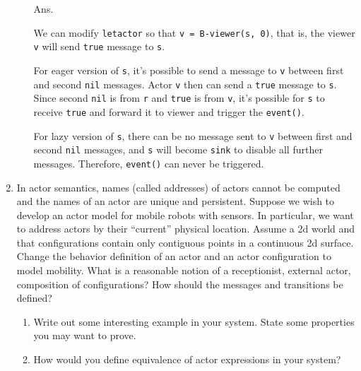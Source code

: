 \documentclass{article}
\begin{document}
\begin{enumerate}
\begin{enumerate}
Ans.

We can modify \texttt{letactor} so that \texttt{v = B-viewer(s, 0)}, that is, 
the viewer \texttt{v} will send \texttt{true} message to \texttt{s}.

For eager version of \texttt{s}, it's possible to send a message to \texttt{v} 
between first and second \texttt{nil} messages. Actor \texttt{v} then can send 
a \texttt{true} message to \texttt{s}. Since second \texttt{nil} is from 
\texttt{r} and \texttt{true} is from \texttt{v}, it's possible for \texttt{s} 
to receive \texttt{true} and forward it to viewer and trigger the 
\texttt{event()}.

For lazy version of \texttt{s}, there can be no message sent to \texttt{v}
between first and second \texttt{nil} messages, and \texttt{s} will become 
\texttt{sink} to disable all further messages. Therefore, \texttt{event()} can 
never be triggered.

\end{enumerate}

\item In actor semantics, names (called addresses) of actors cannot be computed
and the names of an actor are unique and persistent. Suppose we wish to develop
an actor model for mobile robots with sensors. In particular, we want to address
actors by their ``current'' physical location. Assume a 2d world and that
configurations contain only contiguous points in a continuous 2d surface. Change
the behavior definition of an actor and an actor configuration to model
mobility. What is a reasonable notion of a receptionist, external actor,
composition of configurations? How should the messages and transitions be
defined?
\begin{enumerate}
\item Write out some interesting example in your system. State some properties
you may want to prove.



\item How would you define equivalence of actor expressions in your system?
\end{enumerate}

\end{enumerate}
\end{document}
